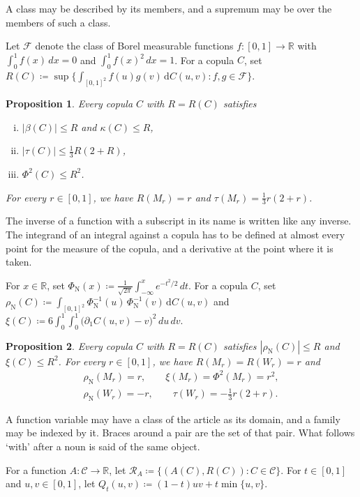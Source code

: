 \documentclass{article}
\newtheorem{proposition}{Proposition}
\newcommand{\CC}{\mathcal{C}}
\begin{document}
A class may be described by its members, and a supremum may be over the members of such
a class.

Let $\mathcal F$ denote the class of Borel measurable functions $f:[0,1]\to\mathbb{R}$ with $\int_0^1 f(x)\,dx=0$ and $\int_0^1 f(x)^2\,dx=1$.
For a copula $C$, set $R(C)\coloneqq\sup\{\int_{[0,1]^2} f(u)g(v)\,\mathrm{d}C(u,v) : f,g\in\mathcal F\}$.

\begin{proposition}\label{p15}
Every copula $C$ with $R=R(C)$ satisfies
\begin{enumerate}[(i)]
\item $|\beta(C)|\le R$ and $\kappa(C)\le R$,
\item $|\tau(C)|\le\frac13R(2+R)$,
\item $\Phi^2(C)\le R^2$.
\end{enumerate}
For every $r\in[0,1]$, we have $R(M_r)=r$ and $\tau(M_r)=\frac13r(2+r)$.
\end{proposition}

The inverse of a function with a subscript in its name is written like any inverse. The
integrand of an integral against a copula has to be defined at almost every point for
the measure of the copula, and a derivative at the point where it is taken.

For $x\in\mathbb{R}$, set $\Phi_{\mathrm N}(x)\coloneqq\frac1{\sqrt{2\pi}}\int_{-\infty}^xe^{-t^2/2}\,dt$.
For a copula $C$, set $\rho_{\mathrm N}(C)\coloneqq\int_{[0,1]^2}\Phi_{\mathrm N}^{-1}(u)\,\Phi_{\mathrm N}^{-1}(v)\,\mathrm{d}C(u,v)$ and $\xi(C)\coloneqq6\int_0^1\int_0^1\bigl(\partial_1C(u,v)-v\bigr)^2\,du\,dv$.

\begin{proposition}\label{p16}
Every copula $C$ with $R=R(C)$ satisfies $|\rho_{\mathrm N}(C)|\le R$ and $\xi(C)\le R^2$.
For every $r\in[0,1]$, we have $R(M_r)=R(W_r)=r$ and
\begin{gather*}
\rho_{\mathrm N}(M_r)=r,\qquad\xi(M_r)=\Phi^2(M_r)=r^2,\\
\rho_{\mathrm N}(W_r)=-r,\qquad\tau(W_r)=-\tfrac13r(2+r).
\end{gather*}
\end{proposition}

A function variable may have a class of the article as its domain, and a family may be
indexed by it. Braces around a pair are the set of that pair. What follows `with' after
a noun is said of the same object.

For a function $A:\CC\to\mathbb{R}$, let $\mathcal R_A\coloneqq\{(A(C),R(C)) : C\in\CC\}$.
For $t\in[0,1]$ and $u,v\in[0,1]$, let $Q_t(u,v)\coloneqq(1-t)uv+t\min\{u,v\}$.
\end{document}
